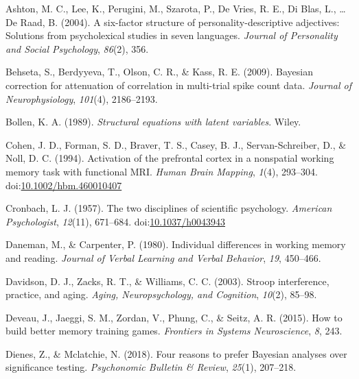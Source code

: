 \documentclass[
  ,man]{apa6}
\newlength{\cslhangindent}
\newlength{\cslentryspacingunit} %
\newenvironment{CSLReferences}[2] %
 {%
  \setlength{\parindent}{0pt}
  \ifodd #1
  \let\oldpar\par
  \def\par{\hangindent=\cslhangindent\oldpar}
  \fi
  \setlength{\parskip}{#2\cslentryspacingunit}
 }%
 {}
\begin{document}
\hypertarget{refs}{}
\begin{CSLReferences}{1}{0}
\leavevmode{}%
Ashton, M. C., Lee, K., Perugini, M., Szarota, P., De Vries, R. E., Di Blas, L., \ldots{} De Raad, B. (2004). A six-factor structure of personality-descriptive adjectives: Solutions from psycholexical studies in seven languages. \emph{Journal of Personality and Social Psychology}, \emph{86}(2), 356.

\leavevmode{}%
Behseta, S., Berdyyeva, T., Olson, C. R., \& Kass, R. E. (2009). Bayesian correction for attenuation of correlation in multi-trial spike count data. \emph{Journal of Neurophysiology}, \emph{101}(4), 2186--2193.

\leavevmode{}%
Bollen, K. A. (1989). \emph{Structural equations with latent variables}. {Wiley}.

\leavevmode{}%
Cohen, J. D., Forman, S. D., Braver, T. S., Casey, B. J., Servan-Schreiber, D., \& Noll, D. C. (1994). Activation of the prefrontal cortex in a nonspatial working memory task with functional {MRI}. \emph{Human Brain Mapping}, \emph{1}(4), 293--304. doi:\href{https://doi.org/10.1002/hbm.460010407}{10.1002/hbm.460010407}

\leavevmode{}%
Cronbach, L. J. (1957). The two disciplines of scientific psychology. \emph{American Psychologist}, \emph{12}(11), 671--684. doi:\href{https://doi.org/10.1037/h0043943}{10.1037/h0043943}

\leavevmode{}%
Daneman, M., \& Carpenter, P. (1980). Individual differences in working memory and reading. \emph{Journal of Verbal Learning and Verbal Behavior}, \emph{19}, 450--466.

\leavevmode{}%
Davidson, D. J., Zacks, R. T., \& Williams, C. C. (2003). Stroop interference, practice, and aging. \emph{Aging, Neuropsychology, and Cognition}, \emph{10}(2), 85--98.

\leavevmode{}%
Deveau, J., Jaeggi, S. M., Zordan, V., Phung, C., \& Seitz, A. R. (2015). How to build better memory training games. \emph{Frontiers in Systems Neuroscience}, \emph{8}, 243.

\leavevmode{}%
Dienes, Z., \& Mclatchie, N. (2018). Four reasons to prefer {Bayesian} analyses over significance testing. \emph{Psychonomic Bulletin \& Review}, \emph{25}(1), 207--218.


\end{CSLReferences}
\end{document}
